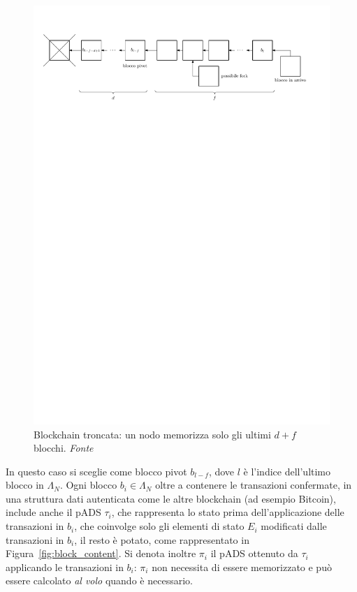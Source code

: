 \begin{figure}
	\centering
	\includegraphics[scale=0.7]{img/capdue/truncated_blockchain.pdf}
	\caption{Blockchain troncata: un nodo memorizza solo gli ultimi $d+f$ blocchi. \emph{Fonte~\cite{bernardini2019blockchains}}}
	\label{fig:blockchain_bern}
\end{figure}

In questo caso si sceglie come blocco pivot $b_{l-f}$, dove $l$ è l'indice dell'ultimo blocco in $\Lambda_N$. Ogni blocco $b_i \in \Lambda_N$ oltre a contenere le transazioni confermate, in una struttura dati autenticata come le altre blockchain (ad esempio Bitcoin), include anche il pADS $\tau_i$, che rappresenta lo stato prima dell'applicazione delle transazioni in $b_i$, che coinvolge solo gli elementi di stato $E_i$ modificati dalle transazioni in $b_i$, il resto è potato, come rappresentato in Figura~\ref{fig:block_content}. Si denota inoltre $\pi_i$ il pADS ottenuto da $\tau_i$ applicando le transazioni in $b_i$: $\pi_i$ non necessita di essere memorizzato e può essere calcolato \emph{al volo} quando è necessario.

